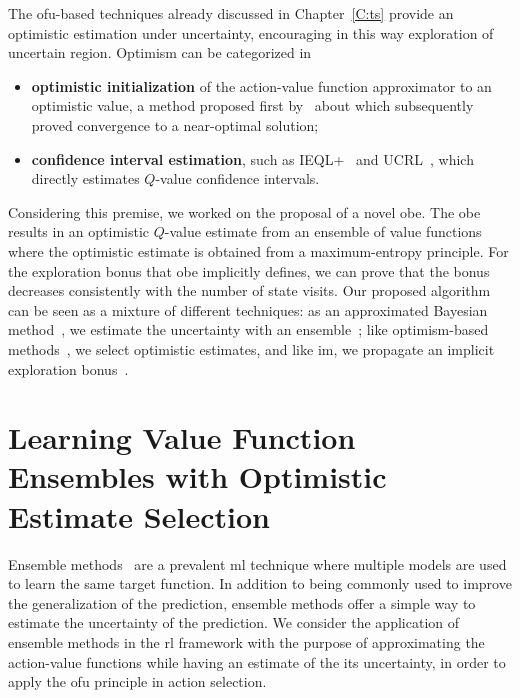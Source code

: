 The \gls{ofu}-based techniques already discussed in Chapter~\ref{C:ts} provide an optimistic estimation under uncertainty, encouraging in this way exploration of uncertain region. Optimism can be categorized in
\begin{itemize}
 \item \textbf{optimistic initialization} of the action-value function approximator to an optimistic value, a method proposed first by~\cite{sutton1998reinforcement} about which subsequently~\cite{even2002convergence} proved convergence to a near-optimal solution;
 \item \textbf{confidence interval estimation}, such as IEQL+~\cite{meuleau1999exploration} and UCRL~\cite{auer2007logarithmic}, which directly estimates $Q$-value confidence intervals.
\end{itemize}

Considering this premise, we worked on the proposal of a novel \gls{obe}. The \gls{obe} results in an optimistic $Q$-value estimate
from an ensemble of value functions where the optimistic estimate is obtained from a maximum-entropy principle. For the exploration bonus that \gls{obe} implicitly defines, we can prove that the bonus decreases consistently with the number of
state visits. Our proposed algorithm can be seen as a mixture of
different techniques: as an approximated Bayesian method~\cite{engel2005reinforcement,vlassis2012bayesian}, we estimate
the uncertainty with an ensemble~\cite{osband2017deep}; like optimism-based methods~\cite{lai1985asymptotically,kearns2002near,brafman2002r,azizzadenesheli2517efficient}, we select
optimistic estimates, and like \gls{im}, we propagate an implicit
exploration bonus~\cite{singh2004intrinsically,schmidhuber2008driven,white2010interval}.

\section{Learning Value Function Ensembles with Optimistic Estimate Selection}
\label{sec:obe}
Ensemble methods~\cite{opitz1999popular} are a prevalent \gls{ml} technique where multiple models are used to learn the same target function. In addition to being commonly used to improve the generalization of the prediction, ensemble methods offer a simple way to estimate the uncertainty of the prediction. We consider the application of ensemble methods in the \gls{rl} framework with the purpose of approximating the action-value functions while having an estimate of the its uncertainty, in order to apply the \gls{ofu} principle in action selection.

